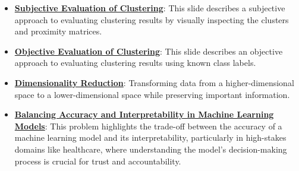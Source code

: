 \documentclass{article}%
\begin{document}
\begin{itemize}[leftmargin=*]
\item \href{https://purdue.brightspace.com/d2l/common/assets/pdfjs-d2l-dist/1.0.14-legacy/web/viewer.html?file=\%2Fcontent\%2Fenforced\%2F1095465-WL.202510.CS24200.LE1\%2F17L2-distance-clusters.pdf\%3Fou\%3D1095465\&lang=en-us\&container=d2l-fileviewer-rendered-pdf\&fullscreen=d2l-fileviewer-rendered-pdf-dialog\&height=667#page=39}{\textbf{Subjective Evaluation of Clustering}}: This slide describes a subjective approach to evaluating clustering results by visually inspecting the clusters and proximity matrices.%
\item \href{https://purdue.brightspace.com/d2l/common/assets/pdfjs-d2l-dist/1.0.14-legacy/web/viewer.html?file=\%2Fcontent\%2Fenforced\%2F1095465-WL.202510.CS24200.LE1\%2F17L2-distance-clusters.pdf\%3Fou\%3D1095465\&lang=en-us\&container=d2l-fileviewer-rendered-pdf\&fullscreen=d2l-fileviewer-rendered-pdf-dialog\&height=667#page=43}{\textbf{Objective Evaluation of Clustering}}: This slide describes an objective approach to evaluating clustering results using known class labels.%
\item \href{https://purdue.brightspace.com/d2l/common/assets/pdfjs-d2l-dist/1.0.14-legacy/web/viewer.html?file=\%2Fcontent\%2Fenforced\%2F1095465-WL.202510.CS24200.LE1\%2F242-19-svd-pca.pdf\%3Fou\%3D1095465\&lang=en-us\&container=d2l-fileviewer-rendered-pdf\&fullscreen=d2l-fileviewer-rendered-pdf-dialog\&height=667#page=8}{\textbf{Dimensionality Reduction}}: Transforming data from a higher-dimensional space to a lower-dimensional space while preserving important information.%
\item \href{https://purdue.brightspace.com/d2l/common/assets/pdfjs-d2l-dist/1.0.14-legacy/web/viewer.html?file=\%2Fcontent\%2Fenforced\%2F1095465-WL.202510.CS24200.LE1\%2F25-ethics.pdf\%3Fou\%3D1095465\&lang=en-us\&container=d2l-fileviewer-rendered-pdf\&fullscreen=d2l-fileviewer-rendered-pdf-dialog\&height=667#page=27}{\textbf{Balancing Accuracy and Interpretability in Machine Learning Models}}: This problem highlights the trade-off between the accuracy of a machine learning model and its interpretability, particularly in high-stakes domains like healthcare, where understanding the model's decision-making process is crucial for trust and accountability.%
\end{itemize}

%
\end{document}
